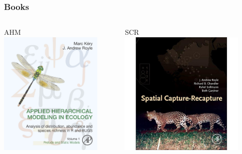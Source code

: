 \documentclass{beamer}\usepackage[]{graphicx}\usepackage[]{color}
\begin{document}
\begin{frame}
  \frametitle{Books}
  \begin{columns}[c]
    \begin{column}{0.5\textwidth}
      \centering
      AHM \\
      \includegraphics[height=6cm]{figs/KeryRoyleBookCover} \\
    \end{column}
    \hfill
    \begin{column}{0.5\textwidth}
      \centering
      SCR \\
      \includegraphics[height=6cm]{figs/SCRcover} \\
    \end{column}
  \end{columns}
\end{frame}
\end{document}
